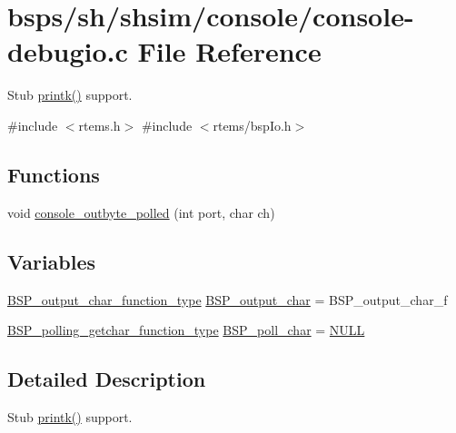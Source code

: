 \hypertarget{console-debugio_8c}{}\section{bsps/sh/shsim/console/console-\/debugio.c File Reference}
\label{console-debugio_8c}


Stub \mbox{\hyperlink{bspIo_8h_a380cfecc8035cec8a13b68c0cb90f32f}{printk()}} support.  


{\ttfamily \#include $<$rtems.\+h$>$}\newline
{\ttfamily \#include $<$rtems/bsp\+Io.\+h$>$}\newline
\subsection*{Functions}
\begin{DoxyCompactItemize}
\item 
void \mbox{\hyperlink{console-debugio_8c_ac9a2a930ad64626626190f49c68bc312}{console\+\_\+outbyte\+\_\+polled}} (int port, char ch)
\end{DoxyCompactItemize}
\subsection*{Variables}
\begin{DoxyCompactItemize}
\item 
\mbox{\hyperlink{bspIo_8h_a0b0dff1c3d35110ae303b4098c60dc14}{B\+S\+P\+\_\+output\+\_\+char\+\_\+function\+\_\+type}} \mbox{\hyperlink{console-debugio_8c_a5fb8c9c4f076f0340b4a17ed432ced5c}{B\+S\+P\+\_\+output\+\_\+char}} = B\+S\+P\+\_\+output\+\_\+char\+\_\+f
\item 
\mbox{\hyperlink{bspIo_8h_a132b9ceff428a634ece5dfaac7ef1006}{B\+S\+P\+\_\+polling\+\_\+getchar\+\_\+function\+\_\+type}} \mbox{\hyperlink{console-debugio_8c_ae5846eecdfa8f2813504371bf01c29b0}{B\+S\+P\+\_\+poll\+\_\+char}} = \mbox{\hyperlink{bestcomm__api_8h_a872bb74de61c3689ccd5b41873fce42c}{N\+U\+LL}}
\end{DoxyCompactItemize}


\subsection{Detailed Description}
Stub \mbox{\hyperlink{bspIo_8h_a380cfecc8035cec8a13b68c0cb90f32f}{printk()}} support. 



